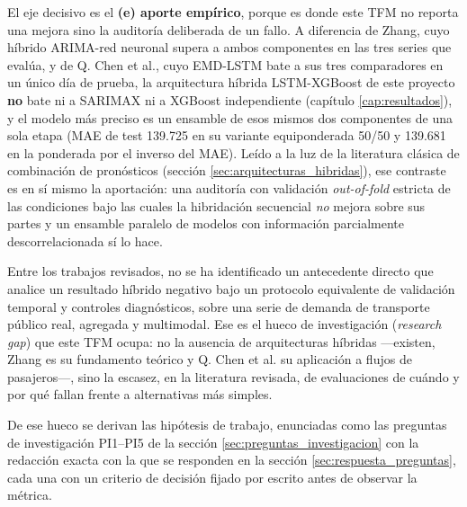 El eje decisivo es el \textbf{(e) aporte empírico}, porque es donde este TFM no reporta
una mejora sino la auditoría deliberada de un fallo. A diferencia de Zhang, cuyo híbrido
ARIMA-red neuronal supera a ambos componentes en las tres series que evalúa, y de Q. Chen et
al., cuyo EMD-LSTM bate a sus tres comparadores en un único día de prueba, la arquitectura
híbrida LSTM-XGBoost de este proyecto \textbf{no} bate ni a SARIMAX ni a XGBoost
independiente (capítulo \ref{cap:resultados}), y el modelo más preciso es un ensamble de
esos mismos dos componentes de una sola etapa (MAE de test 139.725 en su variante
equiponderada 50/50 y 139.681 en la ponderada por el inverso del MAE). Leído a la luz de
la literatura clásica de combinación de pronósticos (sección
\ref{sec:arquitecturas_hibridas}), ese contraste es en sí
mismo la aportación: una auditoría con validación \emph{out-of-fold} estricta de las
condiciones bajo las cuales la hibridación secuencial \emph{no} mejora sobre sus partes y
un ensamble paralelo de modelos con información parcialmente descorrelacionada sí lo
hace.

Entre los trabajos revisados, no se ha identificado un antecedente directo que analice un
resultado híbrido negativo bajo un protocolo equivalente de validación temporal y controles
diagnósticos, sobre una serie de demanda de transporte público real, agregada y multimodal.
Ese es el hueco de investigación (\emph{research gap}) que este TFM ocupa: no la ausencia de arquitecturas híbridas
—existen, Zhang es su fundamento teórico y Q. Chen et al. su aplicación a flujos de
pasajeros—, sino la escasez, en la literatura revisada, de evaluaciones de cuándo y por qué
fallan frente a alternativas más simples.

De ese hueco se derivan las hipótesis de trabajo, enunciadas como las preguntas de
investigación PI1--PI5 de la sección \ref{sec:preguntas_investigacion} con la redacción
exacta con la que se responden en la sección \ref{sec:respuesta_preguntas}, cada una con
un criterio de decisión fijado por escrito antes de observar la métrica.
